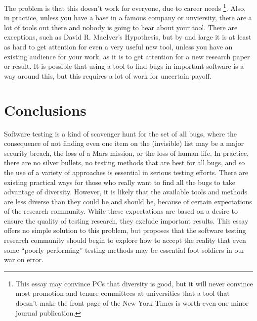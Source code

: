 \documentclass[sigplan,review]{acmart}
\begin{document}
The problem is that this doesn't work for everyone, due to career
needs \footnote{This essay may convince PCs that diversity is good,
  but it will never convince most promotion and tenure committees at
  universities that a tool that doesn't make the front page of the New
  York Times is worth even one minor journal publication.}.  Also, in practice,
unless you have a base in a famous company or unviersity, there are a
lot of tools out there and nobody is going to hear about your tool.
There are exceptions, such as David R. MacIver's Hypothesis, but by
and large it is at least as hard to get attention for even a very
useful new tool, unless you have an existing audience for your work,
as it is to get attention for a new research paper or result.  It is
possible that using a tool to find bugs in important software is a way
around this, but this requires a lot of work for uncertain payoff.

\section{Conclusions}

Software testing is a kind of scavenger hunt for the set of all bugs,
where the consequence of not finding even one item on the (invisible)
list may be a major security breach, the loss of a Mars mission, or
the loss of human life.  In practice, there are no silver bullets, no
testing methods that are best for all bugs, and so the use of a
variety of approaches is essential in serious testing efforts.  There
are existing practical ways for those who really want to find all the
bugs to take advantage of diversity.  However, it is likely that the
available tools and methods are less diverse than they could be and
should be, because of certain expectations of the research community.
While these expectations are based on a desire to ensure the quality
of testing research, they exclude important results.   This essay
offers no simple solution to this problem, but proposes that the
software testing research community should begin to explore how to
accept the reality that even some ``poorly performing'' testing methods may
be essential foot soldiers in our war on error.



\end{document}

